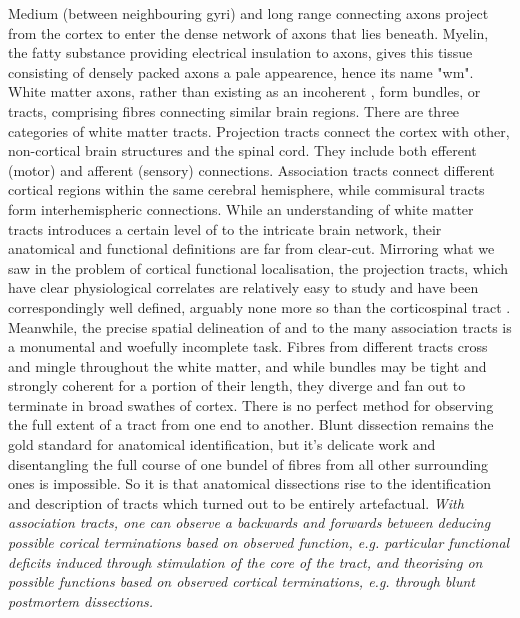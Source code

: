 Medium (between neighbouring gyri) and long range connecting axons project from the cortex to enter the dense network of axons that lies beneath.
Myelin, the fatty substance providing electrical insulation to axons, gives this tissue consisting of densely packed axons a pale appearence, hence its name "\glsdesc{wm}".
White matter axons, rather than existing as an incoherent , form  bundles, or tracts, comprising fibres connecting similar brain regions.
There are three categories of white matter tracts.
Projection tracts connect the cortex with other, non-cortical brain structures and the spinal cord.
They include both efferent (motor) and afferent (sensory) connections.
Association tracts connect different cortical regions within the same cerebral hemisphere, while commisural tracts form interhemispheric connections.
While an understanding of white matter tracts introduces a certain level of  to the intricate brain network, their anatomical and functional definitions are far from clear-cut.
Mirroring what we saw in the problem of cortical functional localisation, the projection tracts, which have clear physiological correlates  are relatively easy to study and have been correspondingly well defined, arguably none more so than the corticospinal tract .
Meanwhile, the precise spatial delineation of and  to the many association tracts is a monumental and woefully incomplete task.
Fibres from different tracts cross and mingle throughout the white matter, and while bundles may be tight and strongly coherent for a portion of their length, they diverge and fan out to terminate in broad swathes of cortex.
There is no perfect method for observing the full extent of a tract from one end to another.
Blunt dissection remains the gold standard for anatomical identification, but it's delicate work and disentangling the full course of one bundel of fibres from all other surrounding ones is impossible.
So it is that anatomical dissections  rise to the identification and description of tracts which turned out to be entirely artefactual. 
\textit{With association tracts, one can observe a backwards and forwards between deducing possible corical terminations based on observed function, e.g. particular functional deficits induced through stimulation of the core of the tract, and theorising on possible functions based on observed cortical terminations, e.g. through blunt postmortem dissections.}

